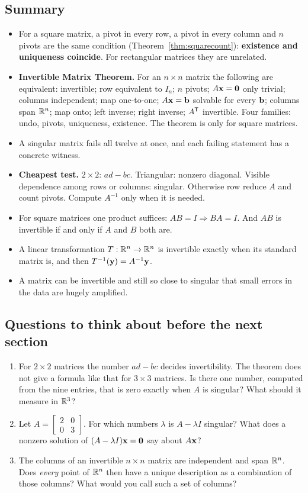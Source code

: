 \documentclass[11pt]{article}
\begin{document}
\subsection*{Summary}
\begin{itemize}
  \item For a square matrix, a pivot in every row, a pivot in every column and $n$ pivots are the same condition (Theorem~\ref{thm:squarecount}): \textbf{existence and uniqueness coincide}. For rectangular matrices they are unrelated.
  \item \textbf{Invertible Matrix Theorem.} For an $n\times n$ matrix the following are equivalent: invertible; row equivalent to $I_n$; $n$ pivots; $A\mathbf{x}=\mathbf{0}$ only trivial; columns independent; map one-to-one; $A\mathbf{x}=\mathbf{b}$ solvable for every $\mathbf{b}$; columns span $\mathbb{R}^n$; map onto; left inverse; right inverse; $A^{\mathsf T}$ invertible. Four families: undo, pivots, uniqueness, existence. The theorem is only for square matrices.
  \item A singular matrix fails all twelve at once, and each failing statement has a concrete witness.
  \item \textbf{Cheapest test.} $2\times2$: $ad-bc$. Triangular: nonzero diagonal. Visible dependence among rows or columns: singular. Otherwise row reduce $A$ and count pivots. Compute $A^{-1}$ only when it is needed.
  \item For square matrices one product suffices: $AB=I\Rightarrow BA=I$. And $AB$ is invertible if and only if $A$ and $B$ both are.
  \item A linear transformation $T:\mathbb{R}^n\to\mathbb{R}^n$ is invertible exactly when its standard matrix is, and then $T^{-1}(\mathbf{y})=A^{-1}\mathbf{y}$.
  \item A matrix can be invertible and still so close to singular that small errors in the data are hugely amplified.
\end{itemize}

\subsection*{Questions to think about before the next section}
\begin{enumerate}
  \item For $2\times2$ matrices the number $ad-bc$ decides invertibility. The theorem does not give a formula like that for $3\times3$ matrices. Is there one number, computed from the nine entries, that is zero exactly when $A$ is singular? What should it measure in $\mathbb{R}^3$?
  \item Let $A=\begin{bmatrix}2&0\\0&3\end{bmatrix}$. For which numbers $\lambda$ is $A-\lambda I$ singular? What does a nonzero solution of $(A-\lambda I)\mathbf{x}=\mathbf{0}$ say about $A\mathbf{x}$?
  \item The columns of an invertible $n\times n$ matrix are independent and span $\mathbb{R}^n$. Does \emph{every} point of $\mathbb{R}^n$ then have a unique description as a combination of those columns? What would you call such a set of columns?
\end{enumerate}
\end{document}
